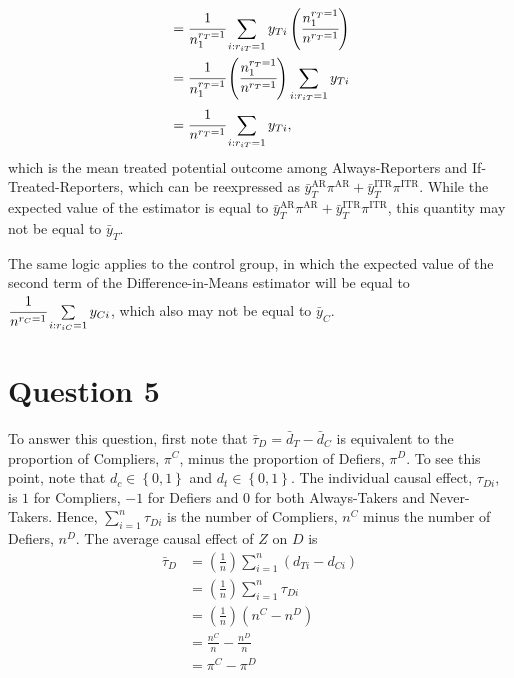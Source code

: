 \documentclass[
  12pt,
  leqno]{article}
\DeclareMathOperator{\1}{\mathbbm{1}}
\begin{document}
\begin{align*}
& = \cfrac{1}{n_1^{r_T = 1}} \sum \limits_{i: r_{iT} = 1} y_{Ti} \left(\cfrac{n_1^{r_T = 1}}{n^{r_T = 1}}\right) \\ 
& = \cfrac{1}{n_1^{r_T = 1}} \left(\cfrac{n_1^{r_T = 1}}{n^{r_T = 1}}\right) \sum \limits_{i: r_{iT} = 1} y_{Ti} \\ 
& = \cfrac{1}{n^{r_T = 1}} \sum \limits_{i: r_{iT} = 1} y_{Ti},
\end{align*} which is the mean treated potential outcome among
Always-Reporters and If-Treated-Reporters, which can be reexpressed as
\(\bar{y}_T^{\text{AR}} \pi^{\text{AR}} + \bar{y}_T^{\text{ITR}} \pi^{\text{ITR}}\).
While the expected value of the estimator is equal to
\(\bar{y}_T^{\text{AR}} \pi^{\text{AR}} + \bar{y}_T^{\text{ITR}} \pi^{\text{ITR}}\),
this quantity may not be equal to \(\bar{y}_T\).

The same logic applies to the control group, in which the expected value
of the second term of the Difference-in-Means estimator will be equal to
\(\cfrac{1}{n^{r_C = 1}} \sum \limits_{i: r_{iC} = 1} y_{Ci}\), which
also may not be equal to \(\bar{y}_C\).

\section*{Question 5}

To answer this question, first note that
\(\bar{\tau}_D = \bar{d}_T - \bar{d}_C\) is equivalent to the proportion
of Compliers, \(\pi^C\), minus the proportion of Defiers, \(\pi^D\). To
see this point, note that \(d_c \in \left\{0, 1\right\}\) and
\(d_t \in \left\{0, 1\right\}\). The individual causal effect,
\(\tau_{Di}\), is \(1\) for Compliers, \(-1\) for Defiers and \(0\) for
both Always-Takers and Never-Takers. Hence,
\(\sum \limits_{i = 1}^n \tau_{Di}\) is the number of Compliers, \(n^C\)
minus the number of Defiers, \(n^D\). The average causal effect of \(Z\)
on \(D\) is \begin{align*}
\bar{\tau}_D & = \left(\frac{1}{n}\right)\sum \limits_{i = 1}^n \left(d_{Ti} - d_{Ci}\right) \\
& = \left(\frac{1}{n}\right) \sum \limits_{i = 1}^n \tau_{Di} \\
& = \left(\frac{1}{n}\right)\left(n^C - n^D\right) \\ 
& = \frac{n^C}{n} - \frac{n^D}{n}\\ 
& = \pi^C - \pi^D
\end{align*}
\end{document}

